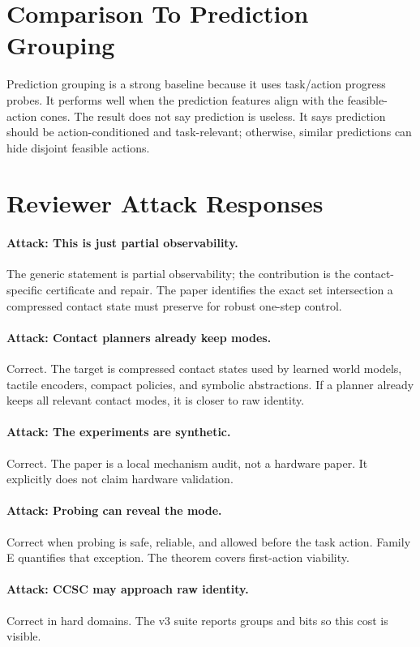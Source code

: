 \documentclass{article}
\begin{document}
\section{Comparison To Prediction Grouping}
Prediction grouping is a strong baseline because it uses task/action progress probes. It performs well when the prediction features align with the feasible-action cones. The result does not say prediction is useless. It says prediction should be action-conditioned and task-relevant; otherwise, similar predictions can hide disjoint feasible actions.

\section{Reviewer Attack Responses}
\paragraph{Attack: This is just partial observability.}
The generic statement is partial observability; the contribution is the contact-specific certificate and repair. The paper identifies the exact set intersection a compressed contact state must preserve for robust one-step control.

\paragraph{Attack: Contact planners already keep modes.}
Correct. The target is compressed contact states used by learned world models, tactile encoders, compact policies, and symbolic abstractions. If a planner already keeps all relevant contact modes, it is closer to raw identity.

\paragraph{Attack: The experiments are synthetic.}
Correct. The paper is a local mechanism audit, not a hardware paper. It explicitly does not claim hardware validation.

\paragraph{Attack: Probing can reveal the mode.}
Correct when probing is safe, reliable, and allowed before the task action. Family E quantifies that exception. The theorem covers first-action viability.

\paragraph{Attack: CCSC may approach raw identity.}
Correct in hard domains. The v3 suite reports groups and bits so this cost is visible.
\end{document}
